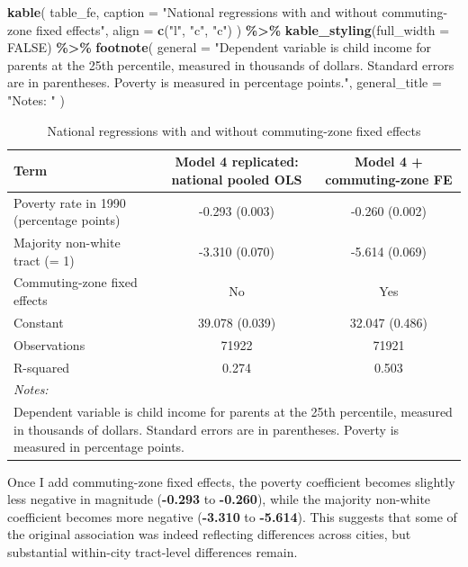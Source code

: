 \documentclass[
]{article}
\newenvironment{Shaded}{\begin{snugshade}}{\end{snugshade}}
\newcommand{\AttributeTok}[1]{\textcolor[rgb]{0.13,0.29,0.53}{#1}}
\newcommand{\ConstantTok}[1]{\textcolor[rgb]{0.56,0.35,0.01}{#1}}
\newcommand{\FunctionTok}[1]{\textcolor[rgb]{0.13,0.29,0.53}{\textbf{#1}}}
\newcommand{\NormalTok}[1]{#1}
\newcommand{\SpecialCharTok}[1]{\textcolor[rgb]{0.81,0.36,0.00}{\textbf{#1}}}
\newcommand{\StringTok}[1]{\textcolor[rgb]{0.31,0.60,0.02}{#1}}
\begin{document}
\begin{Shaded}
\begin{Highlighting}[]
\FunctionTok{kable}\NormalTok{(}
\NormalTok{  table\_fe,}
  \AttributeTok{caption =} \StringTok{"National regressions with and without commuting{-}zone fixed effects"}\NormalTok{,}
  \AttributeTok{align =} \FunctionTok{c}\NormalTok{(}\StringTok{"l"}\NormalTok{, }\StringTok{"c"}\NormalTok{, }\StringTok{"c"}\NormalTok{)}
\NormalTok{) }\SpecialCharTok{\%\textgreater{}\%}
  \FunctionTok{kable\_styling}\NormalTok{(}\AttributeTok{full\_width =} \ConstantTok{FALSE}\NormalTok{) }\SpecialCharTok{\%\textgreater{}\%}
  \FunctionTok{footnote}\NormalTok{(}
    \AttributeTok{general =} \StringTok{"Dependent variable is child income for parents at the 25th percentile, measured in thousands of dollars. Standard errors are in parentheses. Poverty is measured in percentage points."}\NormalTok{,}
    \AttributeTok{general\_title =} \StringTok{"Notes: "}
\NormalTok{  )}
\end{Highlighting}
\end{Shaded}

\begin{longtable}[t]{lcc}
\caption{\label{tab:fe-table}National regressions with and without commuting-zone fixed effects}\\
\toprule
Term & Model 4 replicated: national pooled OLS & Model 4 + commuting-zone FE\\
\midrule
Poverty rate in 1990 (percentage points) & -0.293 (0.003) & -0.260 (0.002)\\
Majority non-white tract (= 1) & -3.310 (0.070) & -5.614 (0.069)\\
Commuting-zone fixed effects & No & Yes\\
Constant & 39.078 (0.039) & 32.047 (0.486)\\
Observations & 71922 & 71921\\
\addlinespace
R-squared & 0.274 & 0.503\\
\bottomrule
\multicolumn{3}{l}{\rule{0pt}{1em}\textit{Notes: }}\\
\multicolumn{3}{l}{\rule{0pt}{1em}Dependent variable is child income for parents at the 25th percentile, measured in thousands of dollars. Standard errors are in parentheses. Poverty is measured in percentage points.}\\
\end{longtable}

Once I add commuting-zone fixed effects, the poverty coefficient becomes
slightly less negative in magnitude (\textbf{-0.293} to
\textbf{-0.260}), while the majority non-white coefficient becomes more
negative (\textbf{-3.310} to \textbf{-5.614}). This suggests that some
of the original association was indeed reflecting differences across
cities, but substantial within-city tract-level differences remain.
\end{document}
